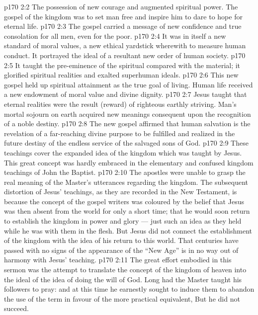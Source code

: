 \vs p170 2:2 \bibnobreakspace The possession of new courage and augmented spiritual power. The gospel of the kingdom was to set man free and inspire him to dare to hope for eternal life.
\vs p170 2:3 \bibnobreakspace The gospel carried a message of new confidence and true consolation for all men, even for the poor.
\vs p170 2:4 \bibnobreakspace It was in itself a new standard of moral values, a new ethical yardstick wherewith to measure human conduct. It portrayed the ideal of a resultant new order of human society.
\vs p170 2:5 \bibnobreakspace It taught the pre\hyp{}eminence of the spiritual compared with the material; it glorified spiritual realities and exalted superhuman ideals.
\vs p170 2:6 \bibnobreakspace This new gospel held up spiritual attainment as the true goal of living. Human life received a new endowment of moral value and divine dignity.
\vs p170 2:7 \bibnobreakspace Jesus taught that eternal realities were the result (reward) of righteous earthly striving. Man’s mortal sojourn on earth acquired new meanings consequent upon the recognition of a noble destiny.
\vs p170 2:8 \bibnobreakspace The new gospel affirmed that human salvation is the revelation of a far\hyp{}reaching divine purpose to be fulfilled and realized in the future destiny of the endless service of the salvaged sons of God.
\vs p170 2:9 \pc These teachings cover the expanded idea of the kingdom which was taught by Jesus. This great concept was hardly embraced in the elementary and confused kingdom teachings of John the Baptist.
\vs p170 2:10 The apostles were unable to grasp the real meaning of the Master’s utterances regarding the kingdom. The subsequent distortion of Jesus’ teachings, as they are recorded in the New Testament, is because the concept of the gospel writers was coloured by the belief that Jesus was then absent from the world for only a short time; that he would soon return to establish the kingdom in power and glory --- just such an idea as they held while he was with them in the flesh. But Jesus did not connect the establishment of the kingdom with the idea of his return to this world. That centuries have passed with no signs of the appearance of the “New Age” is in no way out of harmony with Jesus’ teaching.
\vs p170 2:11 The great effort embodied in this sermon was the attempt to translate the concept of the kingdom of heaven into the ideal of the idea of doing the will of God. Long had the Master taught his followers to pray:  and at this time he earnestly sought to induce them to abandon the use of the term  in favour of the more practical equivalent,  But he did not succeed.
